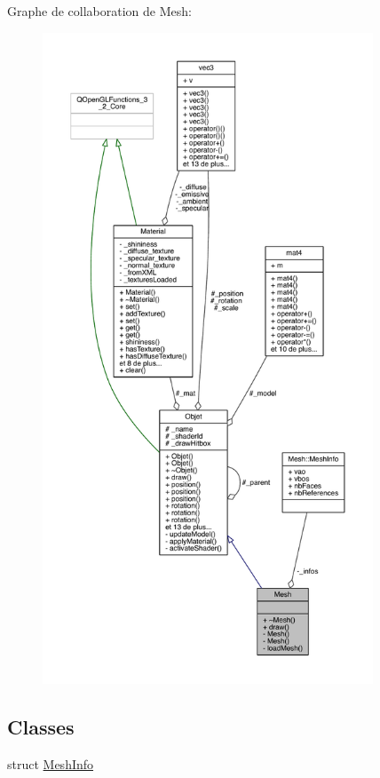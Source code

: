 Graphe de collaboration de Mesh\+:
\nopagebreak
\begin{figure}[H]
\begin{center}
\leavevmode
\includegraphics[height=550pt]{class_mesh__coll__graph}
\end{center}
\end{figure}
\subsection*{Classes}
\begin{DoxyCompactItemize}
\item 
struct \hyperlink{struct_mesh_1_1_mesh_info}{Mesh\+Info}
\end{DoxyCompactItemize}
